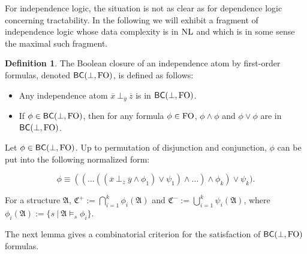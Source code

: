 \documentclass{article}
\theoremstyle{plain}
\theoremstyle{definition}
\newtheorem{definition}[theorem]{Definition}
\newcommand{\mA}{{\mathfrak A}}
\newcommand{\fo}{{\rm FO}}
\newcommand{\nl}{{\rm NL}}
\newcommand{\tu}[1]{\overline{#1}}
\newcommand{\indep}[3]{{#1}\ \bot_{#2}\ {#3}}
\begin{document}
For independence logic, the situation is not as clear as for dependence logic concerning tractability.
 In the following we will exhibit a fragment of independence logic whose data complexity is in $\nl$ and which is in some sense the maximal such fragment. 
 















\newcommand{\bcindepfo}{\mathsf{BC}(\bot,\fo)}
\newcommand{\CCm}{\mathfrak{C}^{-}}
\newcommand{\CCp}{\mathfrak{C}^{+}}

\begin{definition} The Boolean closure of an independence atom by first-order formulas, 
denoted $\bcindepfo$, is defined as follows:

\begin{itemize} 
\item Any independence atom $\indep{\tu x}{\tu y}{\tu z}$ is in $\bcindepfo$.

\item If $\phi\in \bcindepfo$, then for any formula $\phi\in \fo$, $\phi \wedge \phi$ and $\phi\vee \phi$ are  in $\bcindepfo$. 
\end{itemize}
\end{definition}

Let $\phi\in \bcindepfo$. Up to permutation of disjunction and conjunction, $\phi$ can be put into the following normalized form:

\begin{equation}\label{normalized}
\phi\equiv ((\dots ((\indep {\tu x}{\tu z}{\tu y} \wedge \phi_1) \vee \psi_1)\wedge \dots ) \wedge \phi_k) \vee \psi_k).
\end{equation}

For a structure $\mA$, $\CCp:=\bigcap_{i=1}^k \phi_i(\mA)$ and $\CCm:=\bigcup_{i=1}^k \psi_i(\mA)$, where 
 $\phi_i(\mA):=\{s \ |\ \mA\models_s \phi_i \}$. 


The next lemma gives a combinatorial criterion for the satisfaction of $\bcindepfo$ formulas. 
\end{document}
